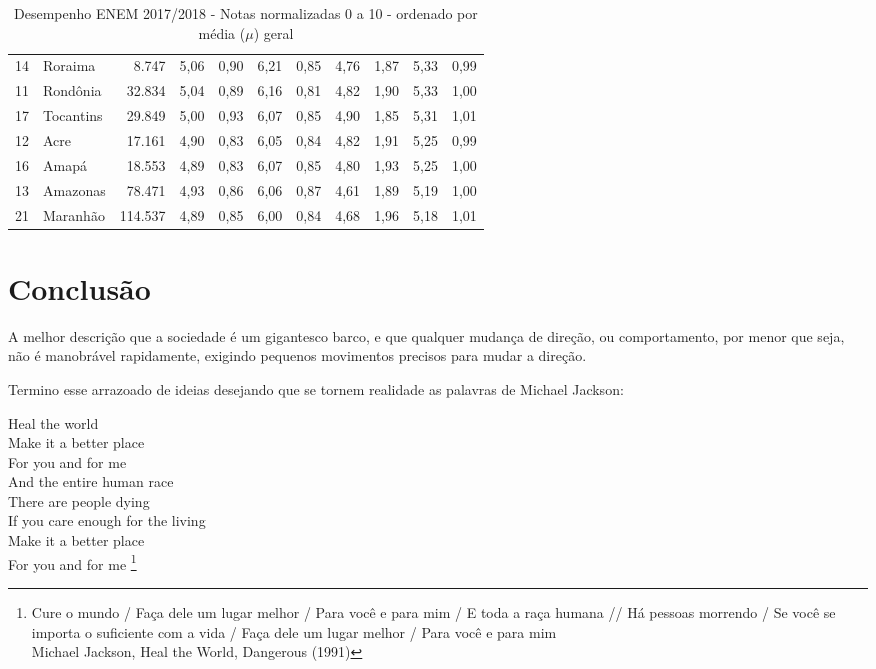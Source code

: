 \begin{table}[]
{\begin{tabular}{llrrrrrrrrr}
            14 & Roraima             & 8.747   & 5,06 & 0,90 & 6,21 & 0,85 & 4,76 & 1,87 & 5,33 & 0,99 \\
            \rowcolor[HTML]{DCE6F1}
            11 & Rondônia            & 32.834  & 5,04 & 0,89 & 6,16 & 0,81 & 4,82 & 1,90 & 5,33 & 1,00 \\
            17 & Tocantins           & 29.849  & 5,00 & 0,93 & 6,07 & 0,85 & 4,90 & 1,85 & 5,31 & 1,01 \\
            \rowcolor[HTML]{DCE6F1}
            12 & Acre                & 17.161  & 4,90 & 0,83 & 6,05 & 0,84 & 4,82 & 1,91 & 5,25 & 0,99 \\
            16 & Amapá               & 18.553  & 4,89 & 0,83 & 6,07 & 0,85 & 4,80 & 1,93 & 5,25 & 1,00 \\
            \rowcolor[HTML]{DCE6F1}
            13 & Amazonas            & 78.471  & 4,93 & 0,86 & 6,06 & 0,87 & 4,61 & 1,89 & 5,19 & 1,00 \\
            21 & Maranhão            & 114.537 & 4,89 & 0,85 & 6,00 & 0,84 & 4,68 & 1,96 & 5,18 & 1,01
        \end{tabular}
    }
    \caption{ Desempenho ENEM 2017/2018 - Notas normalizadas 0 a 10 - ordenado por média ($\mu$) geral}
    \label{table:ENEM}
\end{table}



\section{Conclusão}

A melhor descrição que a sociedade é um gigantesco barco, e que qualquer mudança de direção, ou comportamento, por menor que seja, não é manobrável rapidamente, exigindo pequenos movimentos precisos para mudar a direção.


Termino esse arrazoado de ideias desejando que se tornem realidade as palavras de Michael Jackson:

\begin{citacao}
    Heal the world\\
    Make it a better place\\
    For you and for me\\
    And the entire human race\\

    There are people dying\\
    If you care enough for the living\\
    Make it a better place\\
    For you and for me \footnote{
        Cure o mundo / Faça dele um lugar melhor / Para você e para mim / E toda a raça humana //
        Há pessoas morrendo / Se você se importa o suficiente com a vida / Faça dele um lugar melhor / Para você e para mim \\
        Michael Jackson, Heal the World, Dangerous (1991)
    }
\end{citacao}
